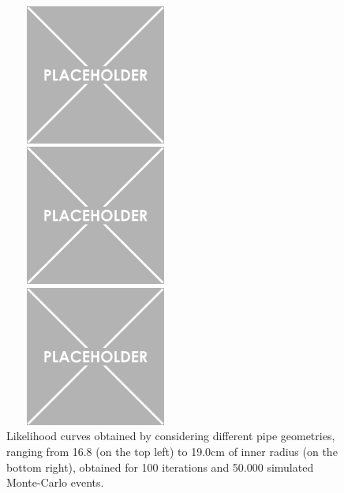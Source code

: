 \documentclass[a4paper, 11pt]{report}
\begin{document}
\begin{figure}[htbp]
\begin{minipage}[b]{.32\textwidth}
\includegraphics[width=6cm, height=4.6cm]{figs/placeholder.png}
\end{minipage}\hfill
\begin{minipage}[b]{.32\textwidth}
\includegraphics[width=6cm, height=4.6cm]{figs/placeholder.png}
\end{minipage} \hfill
\begin{minipage}[b]{.32\textwidth}
\includegraphics[width=6cm, height=4.6cm]{figs/placeholder.png}
\end{minipage} \hfill
\caption{Likelihood curves obtained by considering different pipe geometries, ranging from 16.8 (on the top left) to 19.0cm of inner radius (on the bottom right), obtained for 100 iterations and 50.000 simulated Monte-Carlo events.}
\label{fig:likelihoods2}
\end{figure}
\end{document}
